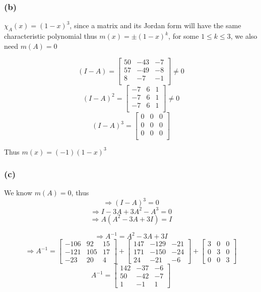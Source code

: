 \documentclass{article}
\begin{document}
\subsubsection*{(b)}
\(\chi_A(x) = (1 - x)^3\), since a matrix and its Jordan form will have the same characteristic polynomial
thus \(m(x) = \pm (1- x)^k\), for some \(1 \leq k \leq 3\), we also need \(m(A) = 0\)

\[
(I - A) = \begin{bmatrix}
    50 & -43 & -7 \\
    57 & -49 & -8 \\
    8 & -7 & -1 \\ 
\end{bmatrix} \neq 0
\]
\[
(I - A)^2 = \begin{bmatrix}
    -7 & 6 & 1 \\
    -7 & 6 & 1  \\
    -7 & 6 & 1  \\
\end{bmatrix} \neq 0 
\]
\[
(I - A)^3 = \begin{bmatrix}
    0 & 0 & 0 \\
    0 & 0 & 0  \\
    0 & 0 & 0  \\
\end{bmatrix}
\]

Thus \(m(x) = (-1)(1 - x)^3\)

\subsubsection*{(c)}
We know \(m(A)= 0\), thus
\[
\Rightarrow (I - A)^3 = 0
\]
\[
\Rightarrow I - 3A + 3A^2 - A^3 = 0
\]
\[
\Rightarrow A(A^2 - 3A + 3I) = I
\]

\[
\Rightarrow A^{-1} = A^2 - 3A + 3I
\]
\[
\Rightarrow A^{-1} = \begin{bmatrix}
    -106 & 92 & 15 \\
    -121 & 105 & 17 \\
    -23 & 20 & 4
\end{bmatrix} + \begin{bmatrix}
    147 & -129 & -21 \\
    171 & -150 & -24 \\
    24 & -21 & -6
\end{bmatrix} + \begin{bmatrix}
    3 & 0 & 0 \\
    0 & 3 & 0 \\
    0 & 0 & 3
\end{bmatrix}
\]
\[
A^{-1} = \begin{bmatrix}
    142 & -37 & -6 \\
    50 & -42 & -7 \\
    1 & -1 & 1
\end{bmatrix}
\]
\end{document}
